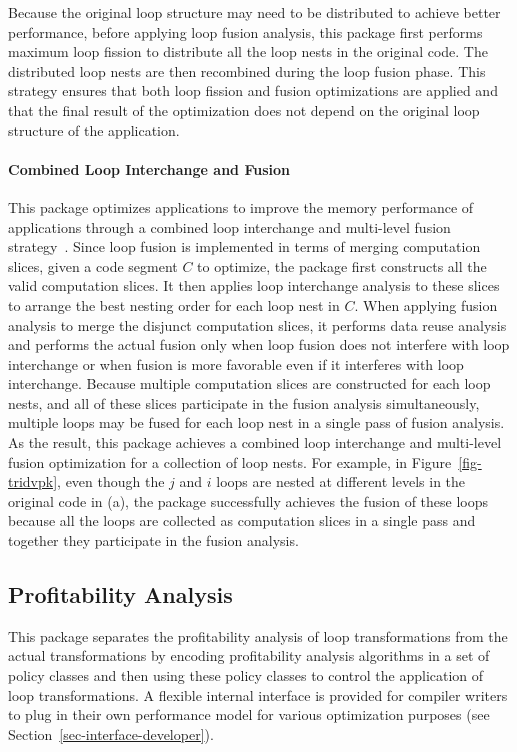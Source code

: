Because the original loop structure may need to be distributed
to achieve better performance, before applying loop fusion
analysis, this package first performs maximum loop fission
to distribute all the loop nests in the original code. The distributed loop nests
are then recombined during the loop fusion phase. This strategy 
ensures that both loop fission and fusion optimizations are
applied and that the final result of the optimization does not
depend on the original loop structure of the application.

\paragraph { Combined  Loop Interchange and Fusion} 
This package optimizes applications to improve the memory performance
of applications through a combined loop interchange and multi-level fusion 
strategy~\cite{YK:LACSI02}.
Since loop fusion is implemented in terms of merging computation slices,
given a code segment $C$ to optimize, the package first 
constructs all the valid computation slices. It then
applies loop interchange analysis to these slices 
to arrange the best nesting order for each loop nest in $C$. 
When applying fusion analysis to merge the disjunct computation slices,
it performs data reuse analysis and performs the actual fusion
only when loop fusion does not interfere with
loop interchange or when fusion is more favorable even if
it interferes with loop interchange.
Because multiple computation slices are constructed for each loop nests,
and all of these slices participate in the fusion analysis simultaneously, 
multiple loops may be fused for each loop nest in a single pass of fusion analysis.
As the result, this package achieves a combined loop interchange and multi-level
fusion optimization for a collection of loop nests.
For example, in Figure~\ref{fig-tridvpk}, even though the $j$ and $i$
loops are nested at different levels in the original code in (a),
the package successfully achieves the fusion of these loops because 
all the loops are collected as computation slices
in a single pass and together they participate in the fusion analysis.

\subsection {Profitability Analysis}

This package separates the profitability analysis of loop transformations
from the actual transformations by encoding profitability analysis
algorithms in a set of policy classes and then using these policy classes to control
the application of loop transformations. A flexible internal interface
is provided for compiler writers to plug in their own performance model
for various optimization purposes (see Section~\ref {sec-interface-developer}).

